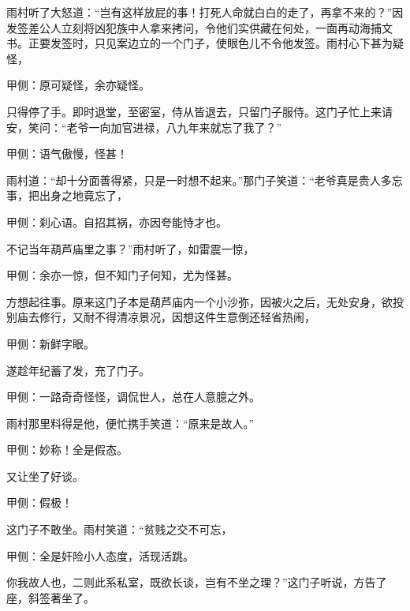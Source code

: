 \begin{parag}
    雨村听了大怒道：“岂有这样放屁的事！打死人命就白白的走了，再拿不来的？”因发签差公人立刻将凶犯族中人拿来拷问，令他们实供藏在何处，一面再动海捕文书。正要发签时，只见案边立的一个门子，使眼色儿不令他发签。雨村心下甚为疑怪，\begin{note}甲侧：原可疑怪，余亦疑怪。\end{note}只得停了手。即时退堂，至密室，侍从皆退去，只留门子服侍。这门子忙上来请安，笑问：“老爷一向加官进禄，八九年来就忘了我了？”\begin{note}甲侧：语气傲慢，怪甚！\end{note}雨村道：“却十分面善得紧，只是一时想不起来。”那门子笑道：“老爷真是贵人多忘事，把出身之地竟忘了，\begin{note}甲侧：刹心语。自招其祸，亦因夸能恃才也。\end{note}不记当年葫芦庙里之事？”雨村听了，如雷震一惊，\begin{note}甲侧：余亦一惊，但不知门子何知，尤为怪甚。\end{note}方想起往事。原来这门子本是葫芦庙内一个小沙弥，因被火之后，无处安身，欲投别庙去修行，又耐不得清凉景况，因想这件生意倒还轻省热闹，\begin{note}甲侧：新鲜字眼。\end{note}遂趁年纪蓄了发，充了门子。\begin{note}甲侧：一路奇奇怪怪，调侃世人，总在人意臆之外。\end{note}雨村那里料得是他，便忙携手笑道：“原来是故人。”\begin{note}甲侧：妙称！全是假态。\end{note}又让坐了好谈。\begin{note}甲侧：假极！\end{note}这门子不敢坐。雨村笑道：“贫贱之交不可忘，\begin{note}甲侧：全是奸险小人态度，活现活跳。\end{note}你我故人也，二则此系私室，既欲长谈，岂有不坐之理？”这门子听说，方告了座，斜签著坐了。
\end{parag}


